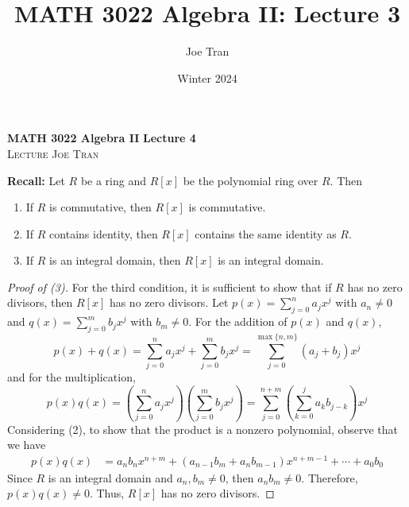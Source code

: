 \documentclass[11pt]{article}
\title{MATH 3022 Algebra II: Lecture 3}
\author{Joe Tran}
\date{Winter 2024}
\theoremstyle{definition}\newtheorem{definition}{Definition}
\theoremstyle{definition}\newtheorem*{notation}{Notation}
\theoremstyle{definition}\newtheorem{example}{Example}
\theoremstyle{theorem}\newtheorem{theorem}{Theorem}
\theoremstyle{theorem}\newtheorem{corollary}{Corollary}
\theoremstyle{theorem}\newtheorem{proposition}{Proposition}
\theoremstyle{theorem}\newtheorem{lemma}{Lemma}
\theoremstyle{theorem}\newtheorem{question}{Question}
\theoremstyle{remark}\newtheorem{remark}{Remark}
\begin{document}
\textbf{MATH 3022 Algebra II} \hfill \textbf{Lecture 4} \\
\textsc{Lecture} \hfill \textsc{Joe Tran}

\textbf{Recall:} Let $R$ be a ring and $R[x]$ be the polynomial ring over $R$. Then
\begin{enumerate}
    \item If $R$ is commutative, then $R[x]$ is commutative.
    \item If $R$ contains identity, then $R[x]$ contains the same identity as $R$.
    \item If $R$ is an integral domain, then $R[x]$ is an integral domain.
\end{enumerate}

\begin{proof}[Proof of (3)]
    For the third condition, it is sufficient to show that if $R$ has no zero divisors, then $R[x]$ has no zero divisors. Let $p(x) = \sum_{j = 0}^{n} a_jx^j$ with $a_n \neq 0$ and $q(x) = \sum_{j = 0}^{m} b_jx^j$ with $b_m \neq 0$. \color{teal} For the addition of $p(x)$ and $q(x)$, 
    \begin{equation*}
        p(x) + q(x) = \sum_{j = 0}^{n} a_jx^j + \sum_{j = 0}^{m} b_jx^j = \sum_{j = 0}^{\max\{n, m\}} (a_j + b_j)x^j \tag{1}
    \end{equation*}
    and for the multiplication, 
    \begin{equation*}
        p(x)q(x) =  \left(\sum_{j = 0}^{n} a_jx^j\right)\left(\sum_{j = 0}^{m} b_jx^j\right) = \sum_{j = 0}^{n + m} \left(\sum_{k = 0}^{j} a_kb_{j - k}\right)x^j \tag{2}
    \end{equation*}
    \color{black} Considering (2), to show that the product is a nonzero polynomial, observe that we have
    \begin{align*}
        p(x)q(x) &= a_nb_nx^{n + m} + (a_{n - 1}b_m + a_nb_{m - 1})x^{n + m - 1}  + \cdots + a_0b_0
    \end{align*}
    Since $R$ is an integral domain and $a_n, b_m \neq 0$, then $a_nb_m \neq 0$. Therefore, $p(x)q(x) \neq 0$. Thus, $R[x]$ has no zero divisors.
\end{proof}
\end{document}
